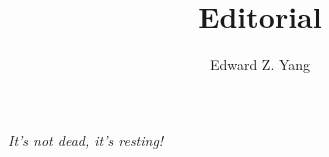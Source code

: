 \documentclass{tmr}
\title{Editorial}
\author{Edward Z. Yang\email{ezyang@mit.edu}}
\begin{document}
\textit{It's not dead, it's resting!}
\end{document}
